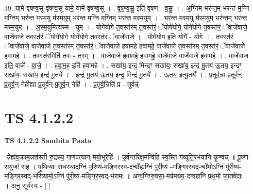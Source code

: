 \documentclass[17pt]{extarticle}
\begin{document}
39. यामे॑ वृषण्व॒सू वृ॑षण्व॒सू यामे॒ यामे॑ वृषण्व॒सू । . वृ॒ष॒ण्व॒सू॒ इति॑ वृषण् - व॒सू॒ । . अ॒ग्निम् भर॑न्त॒म् भर॑न्त म॒ग्नि म॒ग्निम् भर॑न्त मस्म॒यु म॑स्म॒युम् भर॑न्त म॒ग्नि म॒ग्निम् भर॑न्त मस्म॒युम् । . भर॑न्त मस्म॒यु म॑स्म॒युम् भर॑न्त॒म् भर॑न्त मस्म॒युम् । . अ॒स्म॒युमित्य॑स्म - युम् । . योगे॑योगे त॒वस्त॑रम् त॒वस्त॑रं॒ ॅयोगे॑योगे॒ योगे॑योगे त॒वस्त॑रं॒ ॅवाजे॑वाजे॒ वाजे॑वाजे त॒वस्त॑रं॒ ॅयोगे॑योगे॒ योगे॑योगे त॒वस्त॑रं॒ ॅवाजे॑वाजे । . योगे॑योग॒ इति॒ योगे᳚ - यो॒गे॒ । . त॒वस्त॑रं॒ ॅवाजे॑वाजे॒ वाजे॑वाजे त॒वस्त॑रम् त॒वस्त॑रं॒ ॅवाजे॑वाजे हवामहे हवामहे॒ वाजे॑वाजे त॒वस्त॑रम् त॒वस्त॑रं॒ ॅवाजे॑वाजे हवामहे । . त॒वस्त॑र॒मिति॑ त॒वः - त॒र॒म् । . वाजे॑वाजे हवामहे हवामहे॒ वाजे॑वाजे॒ वाजे॑वाजे हवामहे । . वाजे॑वाज॒ इति॒ वाजे᳚ - वा॒जे॒ । . ह॒वा॒म॒ह॒ इति॑ हवामहे । . सखा॑य॒ इन्द्र॒ मिन्द्रꣳ॒॒ सखा॑यः॒ सखा॑य॒ इन्द्र॑ मू॒तय॑ ऊ॒तय॒ इन्द्रꣳ॒॒ सखा॑यः॒ सखा॑य॒ इन्द्र॑ मू॒तये᳚ । . इन्द्र॑ मू॒तय॑ ऊ॒तय॒ इन्द्र॒ मिन्द्र॑ मू॒तये᳚ । . ऊ॒तय॒ इत्यू॒तये᳚ । . प्र॒तूर्व॒न्ना प्र॒तूर्व॑न् प्र॒तूर्व॒न् नेही॒ह्या प्र॒तूर्व॑न् प्र॒तूर्व॒न् नेहि॑ । . प्र॒तूर्व॒न्निति॑ प्र - तूर्वन्न्॑ । \newline
\pagebreak
{}

\section{ TS 4.1.2.2 }

\textbf{TS 4.1.2.2 } \newline
\textbf{Samhita Paata} \newline

-न्नेह्य॑व॒क्राम॒न्नश॑स्ती रु॒द्रस्य॒ गाण॑पत्यान् मयो॒भूरेहि॑ । उ॒र्व॑न्तरि॑क्ष॒मन्वि॑हि स्व॒स्ति ग॑व्यूति॒रभ॑यानि कृ॒ण्वन्न् ॥ पू॒ष्णा स॒युजा॑ स॒ह । पृ॒थि॒व्याः स॒धस्था॑द॒ग्निं पु॑रि॒ष्य॑-मङ्गिर॒स्व-दच्छे᳚ह्य॒ग्निं पु॑री॒ष्य॑ -मङ्गिर॒स्वद-च्छे॑मो॒ऽग्निं पु॑री॒ष्य॑-मङ्गिर॒स्वद्-भ॑रिष्यामो॒ऽग्निं पु॑री॒ष्य॑-मङ्गिर॒स्वद्-भ॑रामः ॥ अन्व॒ग्निरु॒षसा॒-मग्र॑मख्य॒-दन्वहा॑नि प्रथ॒मो जा॒तवे॑दाः । अनु॒ सूर्य॑स्य - [  ] \newline
\end{document}
